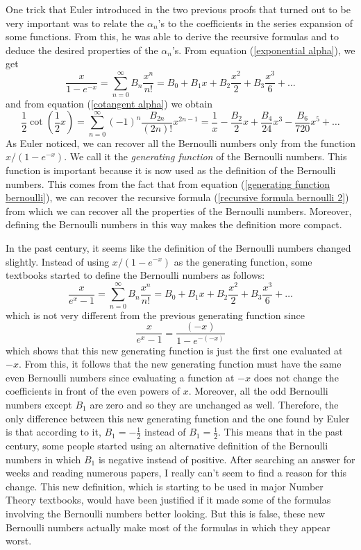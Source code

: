 One trick that Euler introduced in the two previous proofs that turned out to be very important was to relate the $\alpha_n$'s to the coefficients in the series expansion of some functions. From this, he was able to derive the recursive formulas and to deduce the desired properties of the $\alpha_n$'s. From equation (\ref{exponential alpha}), we get
\begin{equation} \label{generating function bernoulli}
    \boxed{\frac{x}{1 - e^{-x}} = \sum_{n=0}^{\infty}B_n\frac{x^n}{n!} = B_0 + B_1x + B_2\frac{x^2}{2} + B_3\frac{x^3}{6} + \dots}
\end{equation}
and from equation (\ref{cotangent alpha}) we obtain 
\begin{equation} \label{cotangent bernoulli}
    \frac{1}{2}\cot\left(\frac{1}{2}x\right) = \sum_{n=0}^{\infty}(-1)^n \frac{B_{2n}}{(2n)!}x^{2n-1} = \frac{1}{x} - \frac{B_2}{2}x + \frac{B_4}{24}x^3 - \frac{B_6}{720}x^5 + \dots 
\end{equation}
As Euler noticed, we can recover all the Bernoulli numbers only from the function $x/(1 - e^{-x})$. We call it the \textit{generating function} of the Bernoulli numbers. This function is important because it is now used as the definition of the Bernoulli numbers. This comes from the fact that from equation (\ref{generating function bernoulli}), we can recover the recursive formula (\ref{recursive formula bernoulli 2}) from which we can recover all the properties of the Bernoulli numbers. Moreover, defining the Bernoulli numbers in this way makes the definition more compact.

In the past century, it seems like the definition of the Bernoulli numbers changed slightly. Instead of using $x/(1 - e^{-x})$ as the generating function, some textbooks started to define the Bernoulli numbers as follows:
$$\frac{x}{e^x - 1} = \sum_{n=0}^{\infty}B_n\frac{x^n}{n!} = B_0 + B_1x + B_2\frac{x^2}{2} + B_3\frac{x^3}{6} + \dots$$
which is not very different from the previous generating function since
$$\frac{x}{e^x - 1} = \frac{(-x)}{1 - e^{-(-x)}}$$
which shows that this new generating function is just the first one evaluated at $-x$. From this, it follows that the new generating function must have the same even Bernoulli numbers since evaluating a function at $-x$ does not change the coefficients in front of the even powers of $x$. Moreover, all the odd Bernoulli numbers except $B_1$ are zero and so they are unchanged as well. Therefore, the only difference between this new generating function and the one found by Euler is that according to it, $B_1 = -\frac{1}{2}$ instead of $B_1 = \frac{1}{2}$. This means that in the past century, some people started using an alternative definition of the Bernoulli numbers in which $B_1$ is negative instead of positive. After searching an answer for weeks and reading numerous papers, I really can't seem to find a reason for this change. This new definition, which is starting to be used in major Number Theory textbooks, would have been justified if it made some of the formulas involving the Bernoulli numbers better looking. But this is false, these new Bernoulli numbers actually make most of the formulas in which they appear worst. 

